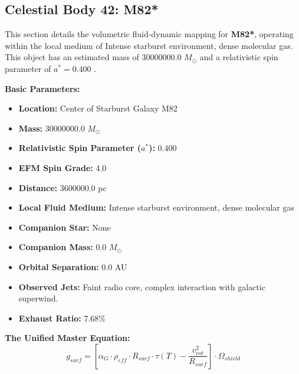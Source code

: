 \documentclass[11pt, a4paper]{article}
\begin{document}
\clearpage
\subsection{Celestial Body 42: M82*}
This section details the volumetric fluid-dynamic mapping for \textbf{M82*}, operating within the local medium of Intense starburst environment, dense molecular gas. This object has an estimated mass of 30000000.0 $M_{\odot}$ and a relativistic spin parameter of $a^* = 0.400$ \cite{gaffney1993, ned}.

\vspace{0.5em}
\noindent \textbf{Basic Parameters:}
\begin{itemize}
  \item \textbf{Location:} Center of Starburst Galaxy M82
  \item \textbf{Mass:} 30000000.0 $M_{\odot}$
  \item \textbf{Relativistic Spin Parameter ($a^*$):} 0.400
  \item \textbf{EFM Spin Grade:} 4.0
  \item \textbf{Distance:} 3600000.0 pc
  \item \textbf{Local Fluid Medium:} Intense starburst environment, dense molecular gas
  \item \textbf{Companion Star:} None
  \item \textbf{Companion Mass:} 0.0 $M_{\odot}$
  \item \textbf{Orbital Separation:} 0.0 AU
  \item \textbf{Observed Jets:} Faint radio core, complex interaction with galactic superwind.
  \item \textbf{Exhaust Ratio:} 7.68\%
\end{itemize}

\vspace{0.5em}
\noindent \textbf{The Unified Master Equation:}
$$ g_{surf} = \left[ \alpha_G \cdot \rho_{eff} \cdot R_{surf} \cdot \tau(T) - \frac{v_{rot}^2}{R_{surf}} \right] \cdot \Omega_{shield} $$
\end{document}
